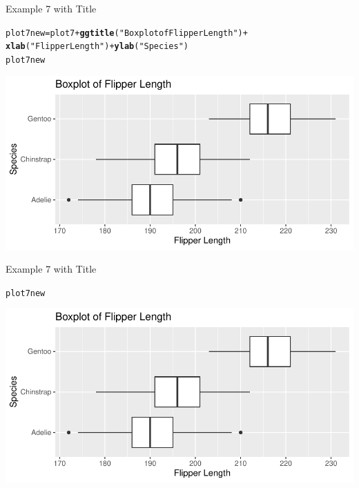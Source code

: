 \documentclass{beamer}\usepackage[]{graphicx}\usepackage[]{xcolor}
\makeatletter
\newcommand{\hlstr}[1]{\textcolor[rgb]{0.192,0.494,0.8}{#1}}%
\newcommand{\hlopt}[1]{\textcolor[rgb]{0,0,0}{#1}}%
\newcommand{\hlstd}[1]{\textcolor[rgb]{0.345,0.345,0.345}{#1}}%
\newcommand{\hlkwb}[1]{\textcolor[rgb]{0.69,0.353,0.396}{#1}}%
\newcommand{\hlkwd}[1]{\textcolor[rgb]{0.737,0.353,0.396}{\textbf{#1}}}%
\newenvironment{kframe}{%
 \def\at@end@of@kframe{}%
 \ifinner\ifhmode%
  \def\at@end@of@kframe{\end{minipage}}%
  \begin{minipage}{\columnwidth}%
 \fi\fi%
 \def\FrameCommand##1{\hskip\@totalleftmargin \hskip-\fboxsep
 \colorbox{shadecolor}{##1}\hskip-\fboxsep
     \hskip-\linewidth \hskip-\@totalleftmargin \hskip\columnwidth}%
 \MakeFramed {\advance\hsize-\width
   \@totalleftmargin\z@ \linewidth\hsize
   \@setminipage}}%
 {\par\unskip\endMakeFramed%
 \at@end@of@kframe}
\newenvironment{knitrout}{}{} %
\makeatother
\begin{document}
\begin{frame}[fragile]{Example 7 with Title}
\begin{knitrout}
\color{fgcolor}\begin{kframe}
\begin{alltt}
\hlstd{plot7new} \hlkwb{=} \hlstd{plot7} \hlopt{+} \hlkwd{ggtitle}\hlstd{(}\hlstr{"Boxplot of Flipper Length"}\hlstd{)} \hlopt{+}
    \hlkwd{xlab}\hlstd{(}\hlstr{"Flipper Length"}\hlstd{)} \hlopt{+} \hlkwd{ylab}\hlstd{(}\hlstr{"Species"}\hlstd{)}
\hlstd{plot7new}
\end{alltt}
\end{kframe}
\includegraphics[width=0.95\linewidth]{figure/unnamed-chunk-36-1} 
\end{knitrout}

\end{frame}

\begin{frame}[fragile]{Example 7 with Title}
\begin{knitrout}
\color{fgcolor}\begin{kframe}
\begin{alltt}
\hlstd{plot7new}
\end{alltt}
\end{kframe}
\includegraphics[width=0.95\linewidth]{figure/unnamed-chunk-37-1} 
\end{knitrout}

\end{frame}
\end{document}
